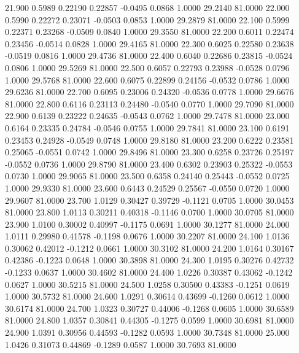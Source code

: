   21.900   0.5989   0.22190   0.22857  -0.0495   0.0868   1.0000  29.2140  81.0000
  22.000   0.5990   0.22272   0.23071  -0.0503   0.0853   1.0000  29.2879  81.0000
  22.100   0.5999   0.22371   0.23268  -0.0509   0.0840   1.0000  29.3550  81.0000
  22.200   0.6011   0.22474   0.23456  -0.0514   0.0828   1.0000  29.4165  81.0000
  22.300   0.6025   0.22580   0.23638  -0.0519   0.0816   1.0000  29.4736  81.0000
  22.400   0.6040   0.22686   0.23815  -0.0524   0.0806   1.0000  29.5269  81.0000
  22.500   0.6057   0.22793   0.23988  -0.0528   0.0796   1.0000  29.5768  81.0000
  22.600   0.6075   0.22899   0.24156  -0.0532   0.0786   1.0000  29.6236  81.0000
  22.700   0.6095   0.23006   0.24320  -0.0536   0.0778   1.0000  29.6676  81.0000
  22.800   0.6116   0.23113   0.24480  -0.0540   0.0770   1.0000  29.7090  81.0000
  22.900   0.6139   0.23222   0.24635  -0.0543   0.0762   1.0000  29.7478  81.0000
  23.000   0.6164   0.23335   0.24784  -0.0546   0.0755   1.0000  29.7841  81.0000
  23.100   0.6191   0.23453   0.24928  -0.0549   0.0748   1.0000  29.8180  81.0000
  23.200   0.6222   0.23581   0.25065  -0.0551   0.0742   1.0000  29.8496  81.0000
  23.300   0.6258   0.23726   0.25197  -0.0552   0.0736   1.0000  29.8790  81.0000
  23.400   0.6302   0.23903   0.25322  -0.0553   0.0730   1.0000  29.9065  81.0000
  23.500   0.6358   0.24140   0.25443  -0.0552   0.0725   1.0000  29.9330  81.0000
  23.600   0.6443   0.24529   0.25567  -0.0550   0.0720   1.0000  29.9607  81.0000
  23.700   1.0129   0.30427   0.39729  -0.1121   0.0705   1.0000  30.0453  81.0000
  23.800   1.0113   0.30211   0.40318  -0.1146   0.0700   1.0000  30.0705  81.0000
  23.900   1.0100   0.30002   0.40997  -0.1175   0.0691   1.0000  30.1277  81.0000
  24.000   1.0111   0.29980   0.41578  -0.1198   0.0676   1.0000  30.2207  81.0000
  24.100   1.0136   0.30062   0.42012  -0.1212   0.0661   1.0000  30.3102  81.0000
  24.200   1.0164   0.30167   0.42386  -0.1223   0.0648   1.0000  30.3898  81.0000
  24.300   1.0195   0.30276   0.42732  -0.1233   0.0637   1.0000  30.4602  81.0000
  24.400   1.0226   0.30387   0.43062  -0.1242   0.0627   1.0000  30.5215  81.0000
  24.500   1.0258   0.30500   0.43383  -0.1251   0.0619   1.0000  30.5732  81.0000
  24.600   1.0291   0.30614   0.43699  -0.1260   0.0612   1.0000  30.6174  81.0000
  24.700   1.0323   0.30727   0.44006  -0.1268   0.0605   1.0000  30.6589  81.0000
  24.800   1.0357   0.30841   0.44305  -0.1275   0.0599   1.0000  30.6981  81.0000
  24.900   1.0391   0.30956   0.44593  -0.1282   0.0593   1.0000  30.7348  81.0000
  25.000   1.0426   0.31073   0.44869  -0.1289   0.0587   1.0000  30.7693  81.0000
